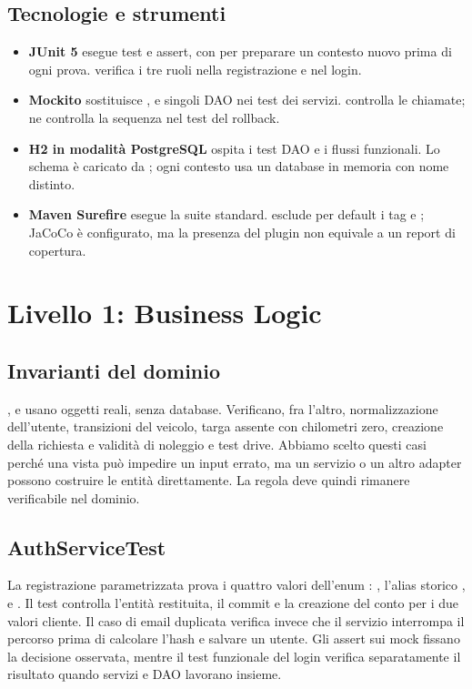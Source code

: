 \subsection{Tecnologie e strumenti}
\begin{itemize}
  \item \textbf{JUnit 5} esegue test e assert, con  per preparare un contesto nuovo prima di ogni prova.  verifica i tre ruoli nella registrazione e nel login.
  \item \textbf{Mockito} sostituisce ,  e singoli DAO nei test dei servizi.  controlla le chiamate;  ne controlla la sequenza nel test del rollback.
  \item \textbf{H2 in modalità PostgreSQL} ospita i test DAO e i flussi funzionali. Lo schema è caricato da ; ogni contesto usa un database in memoria con nome distinto.
  \item \textbf{Maven Surefire} esegue la suite standard.  esclude per default i tag  e ; JaCoCo è configurato, ma la presenza del plugin non equivale a un report di copertura.
\end{itemize}

\section{Livello 1: Business Logic}

\subsection{Invarianti del dominio}
,  e  usano oggetti reali, senza database. Verificano, fra l'altro, normalizzazione dell'utente, transizioni del veicolo, targa assente con chilometri zero, creazione della richiesta e validità di noleggio e test drive. Abbiamo scelto questi casi perché una vista può impedire un input errato, ma un servizio o un altro adapter possono costruire le entità direttamente. La regola deve quindi rimanere verificabile nel dominio.

\subsection{AuthServiceTest}
La registrazione parametrizzata prova i quattro valori dell'enum : , l'alias storico ,  e . Il test controlla l'entità restituita, il commit e la creazione del conto per i due valori cliente. Il caso di email duplicata verifica invece che il servizio interrompa il percorso prima di calcolare l'hash e salvare un utente. Gli assert sui mock fissano la decisione osservata, mentre il test funzionale del login verifica separatamente il risultato quando servizi e DAO lavorano insieme.

